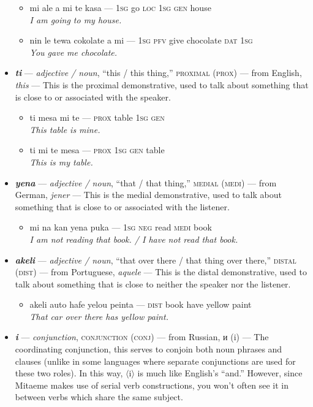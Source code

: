 \documentclass[a4paper]{article}
\begin{document}
\begin{itemize}
	\begin{itemize}
		\item mi ale a mi te kasa — \textsc{1sg} go \textsc{loc 1sg gen} house \\\textit{I am going to my house.}
		\item nin le tewa cokolate a mi — \textsc{1sg pfv} give chocolate \textsc{dat 1sg} \\\textit{You gave me chocolate.}
	\end{itemize}
	\item \textbf{\textit{ti}} — \textit{adjective / noun}, ``this / this thing,'' \textsc{proximal (prox)} — from English, \textit{this} — This is the proximal demonstrative, used to talk about something that is close to or associated with the speaker.
	\begin{itemize}
		\item ti mesa mi te — \textsc{prox} table \textsc{1sg gen} \\\textit{This table is mine.}
		\item ti mi te mesa — \textsc{prox 1sg gen} table \\\textit{This is my table.}
	\end{itemize}
	\item \textbf{\textit{yena}} — \textit{adjective / noun}, ``that / that thing,'' \textsc{medial (medi)}  — from German, \textit{jener} — This is the medial demonstrative, used to talk about something that is close to or associated with the listener.
	\begin{itemize}
		\item mi na kan yena puka — \textsc{1sg neg} read \textsc{medi} book \\\textit{I am not reading that book. / I have not read that book.}
	\end{itemize}
	\item \textbf{\textit{akeli}} — \textit{adjective / noun}, ``that over there / that thing over there,'' \textsc{distal (dist)}  — from Portuguese, \textit{aquele} — This is the distal demonstrative, used to talk about something that is close to neither the speaker nor the listener.
	\begin{itemize}
		\item akeli auto hafe yelou peinta — \textsc{dist} book have yellow paint \\\textit{That car over there has yellow paint.}
	\end{itemize}
	\item \textbf{\textit{i}} — \textit{conjunction}, \textsc{conjunction (conj)}  — from Russian, и (i) — The coordinating conjunction, this serves to conjoin both noun phrases and clauses (unlike in some languages where separate conjunctions are used for these two roles). In this way, $\langle$i$\rangle$ is much like English's ``and.'' However, since Mitaeme makes use of serial verb constructions, you won't often see it in between verbs which share the same subject.

\end{itemize}
\end{document}
